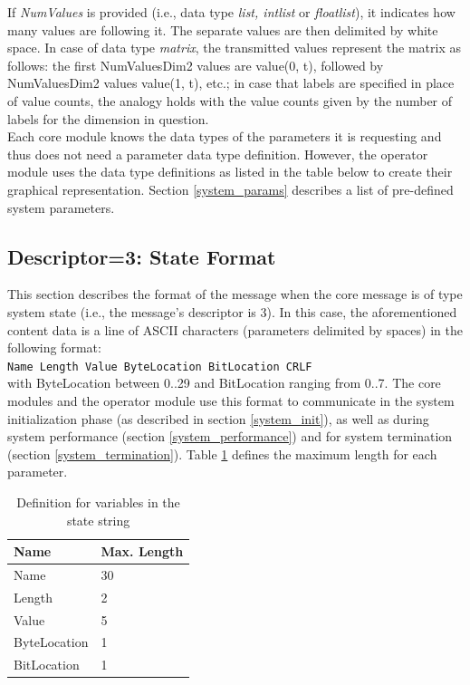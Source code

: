 \documentclass[letterpaper,oneside,12pt]{book}
\newcommand{\todo}[1]{}
\begin{document}
If \textit{NumValues} is provided (i.e., data type \textit{list, intlist} or 
\textit{floatlist}), it indicates how many values are following it. The separate 
values are then delimited by white space. In case of data type \textit{matrix}, 
the transmitted values represent the matrix as follows: the first NumValuesDim2 
values are value(0, t), followed by NumValuesDim2 values value(1, t), etc.;
in case that labels are specified in place of value counts, the analogy holds
with the value counts given by the number of labels for the dimension in
question.\\

Each core module knows the data types of the parameters it is requesting and 
thus does not need a parameter data type definition. However, the operator 
module uses the data type definitions as listed in the table below to create 
their graphical representation. Section \ref{system_params} describes a list of 
pre-defined system parameters.


\subsection{Descriptor=3: State Format}
\label{state_format}

This section describes the format of the message when the core message is of 
type system state (i.e., the message's descriptor is 3). In this case, the 
aforementioned content data is a line of ASCII characters (parameters
delimited by spaces) in the following format:
\\[2ex]
\verb|Name Length Value ByteLocation BitLocation CRLF|
\\[2ex]
with ByteLocation between 0..29 \todo{Why this value?} and BitLocation ranging from 0..7.
The core modules and the operator module use this format to communicate in 
the system initialization phase (as described in section \ref{system_init}), 
as well as during system performance (section \ref{system_performance}) and 
for system termination (section \ref{system_termination}). Table 
\ref{state_table} defines the maximum length for each parameter.

\begin{table}[ht]
 \centering
 \begin{tabular}{|l|l|}
  \hline
  \textbf{Name} & \textbf{Max. Length} \\
  \hline
  Name & 30 \\
  \hline
  Length & 2 \\
  \hline
  Value & 5 \\
  \hline
  ByteLocation & 1 \\
  \hline
  BitLocation & 1 \\
  \hline
 \end{tabular}
 \caption{Definition for variables in the state string}
 \label{state_table}
\end{table}   
\end{document}
